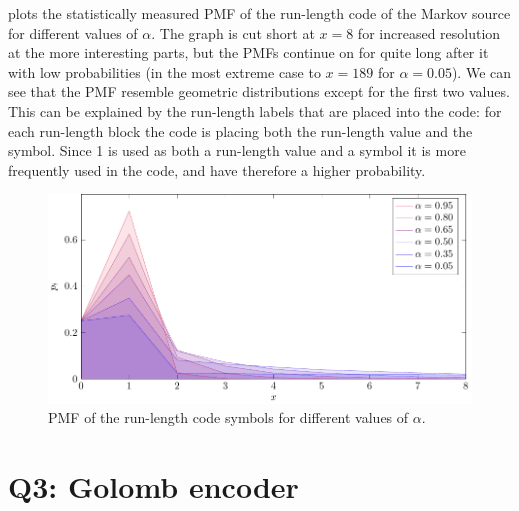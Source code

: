 \documentclass{article}
\begin{document}
 plots the statistically measured PMF of the run-length code of the Markov source
for different values of $\alpha$.
The graph is cut short at $x=8$ for increased resolution at the more interesting parts,
but the PMFs continue on for quite long after it with low probabilities
(in the most extreme case to $x=189$ for $\alpha=0.05$).
We can see that the PMF resemble geometric distributions except for the first two values.
This can be explained by the run-length labels that are placed into the code:
for each run-length block the code is placing both the run-length value and the symbol.
Since 1 is used as both a run-length value and a symbol it is more frequently used in the code,
and have therefore a higher probability.

\begin{figure}[!ht]
  \centering
  \includegraphics{../tikz/runlength_pmf/runlength_pmf.pdf}
  \caption{PMF of the run-length code symbols for different values of $\alpha$.}
  \label{fig:pmf}
\end{figure}

\section{Q3: Golomb encoder}
\end{document}
